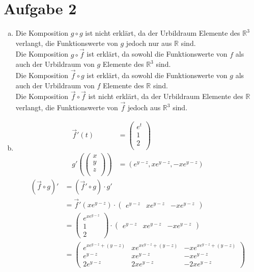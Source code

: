 \documentclass[10pt,a4paper,parskip=half]{scrartcl}
\newcommand{\R}{\mathbb{R}}
\newcommand{\vecthree}[3]{\begin{pmatrix}#1\\#2\\#3\\\end {pmatrix}}
\begin{document}
\section*{Aufgabe 2}
\begin{enumerate}[(a)]
\item
Die Komposition $g \circ g$ ist nicht erklärt, da der Urbildraum Elemente des $\mathbb{\R}^3$ verlangt, die Funktionswerte von $g$ jedoch nur aus $\mathbb{\R}$ sind.\\
Die Komposition $g \circ \vec f$ ist erklärt, da sowohl die Funktionswerte von $f$ als auch der Urbildraum von $g$ Elemente des $\mathbb{\R}^3$ sind.\\
Die Komposition $\vec f \circ g$ ist erklärt, da sowohl die Funktionswerte von $g$ als auch der Urbildraum von $f$ Elemente des $\mathbb{\R}$ sind.\\
Die Komposition $\vec f \circ \vec f$ ist nicht erklärt, da der Urbildraum Elemente des $\mathbb{\R}$ verlangt, die Funktionswerte von $\vec f$ jedoch aus $\mathbb{\R}^3$ sind.\item
\begin{align*}
\vec f'(t) &= \vecthree{e^t}{1}{2} \\
g'(\vecthree{x}{y}{z}) &= \left(e^{y-z}, xe^{y-z}, -xe^{y-z}\right)
\end{align*}
\begin{align*} 
(\vec f \circ g)' &= (\vec f' \circ g) \cdot g' \\
&= \vec f'(xe^{y-z}) \cdot \begin{pmatrix}e^{y-z} & xe^{y-z} & -xe^{y-z}\end{pmatrix} \\
&= \begin{pmatrix}e^{xe^{y-z}} \\ 1\\2 \end{pmatrix} \cdot \begin{pmatrix}e^{y-z} & xe^{y-z} &  -xe^{y-z}\end{pmatrix}\\
&= \begin{pmatrix}e^{xe^{y-z}+\left(y-z\right)} & xe^{xe^{y-z}+\left(y-z\right)} & -xe^{xe^{y-z}+\left(y-z\right)} \\ e^{y-z} & xe^{y-z} &  -xe^{y-z} \\ 2e^{y-z} & 2xe^{y-z} &  -2xe^{y-z}\end{pmatrix}\\

\end{align*}
\end{enumerate}
\end{document}
